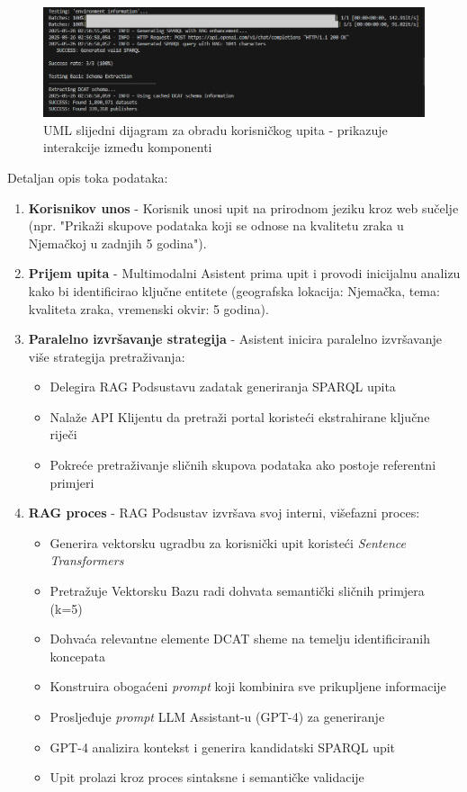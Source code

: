 \begin{figure}[htbp]
    \centering
    \includegraphics[width=1\textwidth]{figures/izvjestaj_image_11.png}
    \caption{UML slijedni dijagram za obradu korisničkog upita - prikazuje interakcije između komponenti}
    \label{fig:sequence_diagram_uml}
\end{figure}

Detaljan opis toka podataka:

\begin{enumerate}
    \item \textbf{Korisnikov unos} - Korisnik unosi upit na prirodnom jeziku kroz web sučelje (npr. "Prikaži skupove podataka koji se odnose na kvalitetu zraka u Njemačkoj u zadnjih 5 godina").
    
    \item \textbf{Prijem upita} - Multimodalni Asistent prima upit i provodi inicijalnu analizu kako bi identificirao ključne entitete (geografska lokacija: Njemačka, tema: kvaliteta zraka, vremenski okvir: 5 godina).
    
    \item \textbf{Paralelno izvršavanje strategija} - Asistent inicira paralelno izvršavanje više strategija pretraživanja:
    \begin{itemize}
        \item Delegira RAG Podsustavu zadatak generiranja SPARQL upita
        \item Nalaže API Klijentu da pretraži portal koristeći ekstrahirane ključne riječi
        \item Pokreće pretraživanje sličnih skupova podataka ako postoje referentni primjeri
    \end{itemize}
    
    \item \textbf{RAG proces} - RAG Podsustav izvršava svoj interni, višefazni proces:
    \begin{itemize}
        \item Generira vektorsku ugradbu za korisnički upit koristeći \textit{Sentence Transformers}
        \item Pretražuje Vektorsku Bazu radi dohvata semantički sličnih primjera (k=5)
        \item Dohvaća relevantne elemente DCAT sheme na temelju identificiranih koncepata
        \item Konstruira obogaćeni \textit{prompt} koji kombinira sve prikupljene informacije
        \item Prosljeđuje \textit{prompt} LLM Assistant-u (GPT-4) za generiranje
        \item GPT-4 analizira kontekst i generira kandidatski SPARQL upit
        \item Upit prolazi kroz proces sintaksne i semantičke validacije
    \end{itemize}
    

\end{enumerate}
